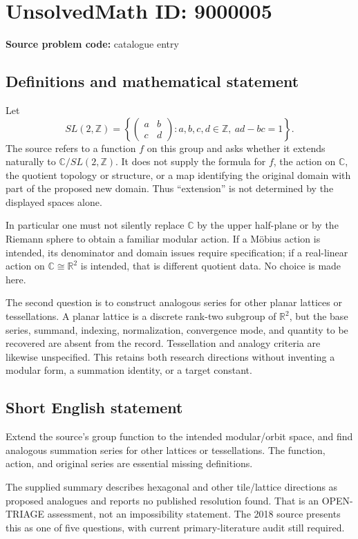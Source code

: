 \documentclass[11pt]{article}
\newcommand{\Z}{\mathbb{Z}}
\newcommand{\R}{\mathbb{R}}
\newcommand{\C}{\mathbb{C}}
\begin{document}
\section*{UnsolvedMath ID: 9000005}
\textbf{Source problem code:} catalogue entry
\subsection{Definitions and mathematical statement}
Let
\[
 SL(2,\Z)=\left\{\begin{pmatrix}a&b\\c&d\end{pmatrix}:
 a,b,c,d\in\Z,\ ad-bc=1\right\}.
\]
The source refers to a function $f$ on this group and asks whether it extends naturally to $\C/SL(2,\Z)$. It does not supply the formula for $f$, the action on $\C$, the quotient topology or structure, or a map identifying the original domain with part of the proposed new domain. Thus ``extension'' is not determined by the displayed spaces alone.

In particular one must not silently replace $\C$ by the upper half-plane or by the Riemann sphere to obtain a familiar modular action. If a Möbius action is intended, its denominator and domain issues require specification; if a real-linear action on $\C\cong\R^2$ is intended, that is different quotient data. No choice is made here.

The second question is to construct analogous series for other planar lattices or tessellations. A planar lattice is a discrete rank-two subgroup of $\R^2$, but the base series, summand, indexing, normalization, convergence mode, and quantity to be recovered are absent from the record. Tessellation and analogy criteria are likewise unspecified. This retains both research directions without inventing a modular form, a summation identity, or a target constant.
\subsection{Short English statement}
Extend the source's group function to the intended modular/orbit space, and find analogous summation series for other lattices or tessellations. The function, action, and original series are essential missing definitions.

The supplied summary describes hexagonal and other tile/lattice directions as proposed analogues and reports no published resolution found. That is an OPEN-TRIAGE assessment, not an impossibility statement. The 2018 source presents this as one of five questions, with current primary-literature audit still required.
\end{document}
